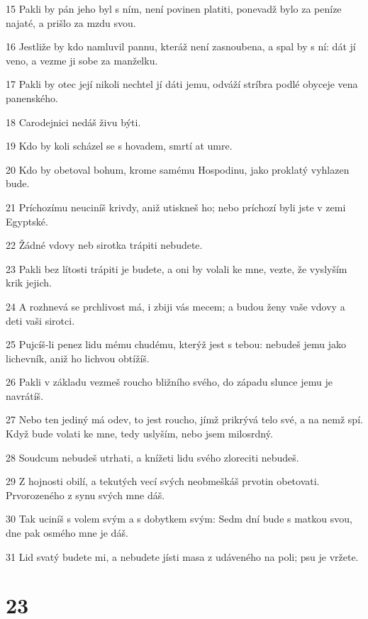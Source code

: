 \par 15 Pakli by pán jeho byl s ním, není povinen platiti, ponevadž bylo za peníze najaté, a prišlo za mzdu svou.
\par 16 Jestliže by kdo namluvil pannu, kteráž není zasnoubena, a spal by s ní: dát jí veno, a vezme ji sobe za manželku.
\par 17 Pakli by otec její nikoli nechtel jí dáti jemu, odváží stríbra podlé obyceje vena panenského.
\par 18 Carodejnici nedáš živu býti.
\par 19 Kdo by koli scházel se s hovadem, smrtí at umre.
\par 20 Kdo by obetoval bohum, krome samému Hospodinu, jako proklatý vyhlazen bude.
\par 21 Príchozímu neuciníš krivdy, aniž utiskneš ho; nebo príchozí byli jste v zemi Egyptské.
\par 22 Žádné vdovy neb sirotka trápiti nebudete.
\par 23 Pakli bez lítosti trápiti je budete, a oni by volali ke mne, vezte, že vyslyším krik jejich.
\par 24 A rozhnevá se prchlivost má, i zbiji vás mecem; a budou ženy vaše vdovy a deti vaši sirotci.
\par 25 Pujcíš-li penez lidu mému chudému, kterýž jest s tebou: nebudeš jemu jako lichevník, aniž ho lichvou obtížíš.
\par 26 Pakli v základu vezmeš roucho bližního svého, do západu slunce jemu je navrátíš.
\par 27 Nebo ten jediný má odev, to jest roucho, jímž prikrývá telo své, a na nemž spí. Když bude volati ke mne, tedy uslyším, nebo jsem milosrdný.
\par 28 Soudcum nebudeš utrhati, a knížeti lidu svého zloreciti nebudeš.
\par 29 Z hojnosti obilí, a tekutých vecí svých neobmeškáš prvotin obetovati. Prvorozeného z synu svých mne dáš.
\par 30 Tak uciníš s volem svým a s dobytkem svým: Sedm dní bude s matkou svou, dne pak osmého mne je dáš.
\par 31 Lid svatý budete mi, a nebudete jísti masa z udáveného na poli; psu je vržete.

\chapter{23}

